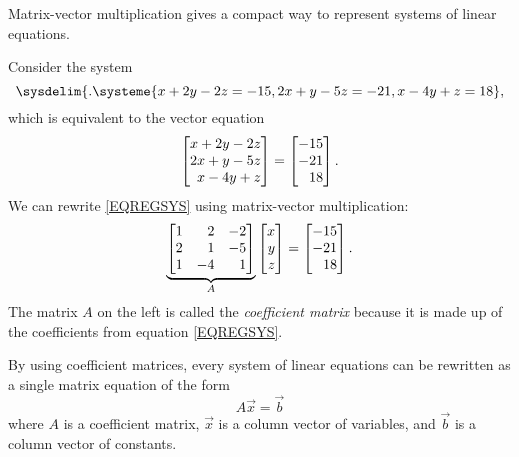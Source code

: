 Matrix-vector multiplication gives a compact way to represent systems of linear equations.

Consider the system
\begin{equation}
	\label{EQREGSYS}
	\sysdelim\{.
		\systeme{
			x+2y-2z=-15,
			2x+y-5z=-21,
			x-4y+z=18
		},
\end{equation}
which is equivalent to the vector equation
\[
	\mat{x+2y-2z\\
           2x+y-5z\\
	     x-4y+z}=\mat{-15\\-21\\18}.
\]
We can rewrite \eqref{EQREGSYS} using matrix-vector multiplication:
\[
	\underbrace{\mat{1&2&-2\\2&1&-5\\1&-4&1}}_{A}\mat{x\\y\\z}=\mat{-15\\-21\\18}.
\]
The matrix $A$ on the left is called the \emph{coefficient matrix} because it
is made up of the coefficients from equation \eqref{EQREGSYS}.

\medskip
By using coefficient matrices, every system of linear equations can be rewritten as a single matrix equation
of the form
\[
	A\vec x=\vec b
\]
where $A$ is a coefficient matrix, $\vec x$ is a column vector of variables, and $\vec b$
is a column vector of constants.

